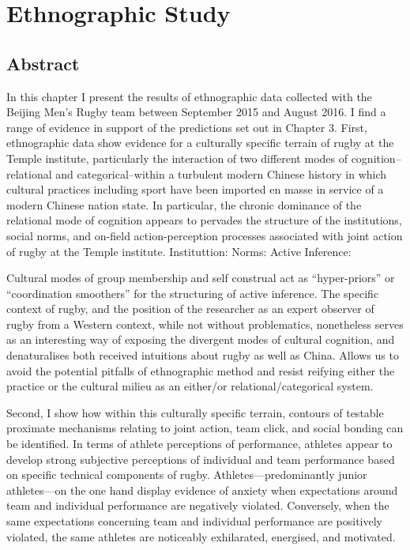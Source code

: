 


\chapter{\label{4ethnographicField}Ethnographic Study}

\minitoc
\section{Abstract}
In this chapter I present the results of ethnographic data collected with the Beijing Men's Rugby team between September 2015 and August 2016.  I find a range of evidence in support of the predictions set out in Chapter 3.  First, ethnographic data show evidence  for a culturally specific terrain of rugby at the Temple institute, particularly the interaction of two different modes of cognition--relational and categorical--within a turbulent modern Chinese history in which cultural practices including sport have been imported en masse in service of a modern Chinese nation state. In particular, the chronic dominance of the relational mode of cognition appears to pervades the structure of the institutions, social norms, and on-field action-perception processes associated with joint action of rugby at the Temple institute.  Instituttion:  Norms: Active Inference:

Cultural modes of group membership and self construal act as ``hyper-priors'' or ``coordination smoothers'' for the structuring of active inference.  The specific context of rugby, and the position of the researcher as an expert observer of rugby from a Western context, while not without problematics, nonetheless serves as an interesting way of exposing the divergent modes of cultural cognition, and denaturalises both received intuitions about rugby as well as China.  Allows us to avoid the potential pitfalls of ethnographic method and resist reifying either the practice or the cultural milieu as an either/or relational/categorical system.

Second, I show how within this culturally specific terrain, contours of testable proximate mechanisms relating to joint action, team click, and social bonding can be identified.   In terms of athlete perceptions of performance, athletes appear to develop strong subjective perceptions of individual and team performance based on specific technical components of rugby.   Athletes---predominantly junior athletes---on the one hand display evidence of anxiety when expectations around team and individual performance are negatively violated.  Conversely, when the same expectations concerning team and individual performance are positively violated, the same athletes are noticeably exhilarated, energised, and motivated.

